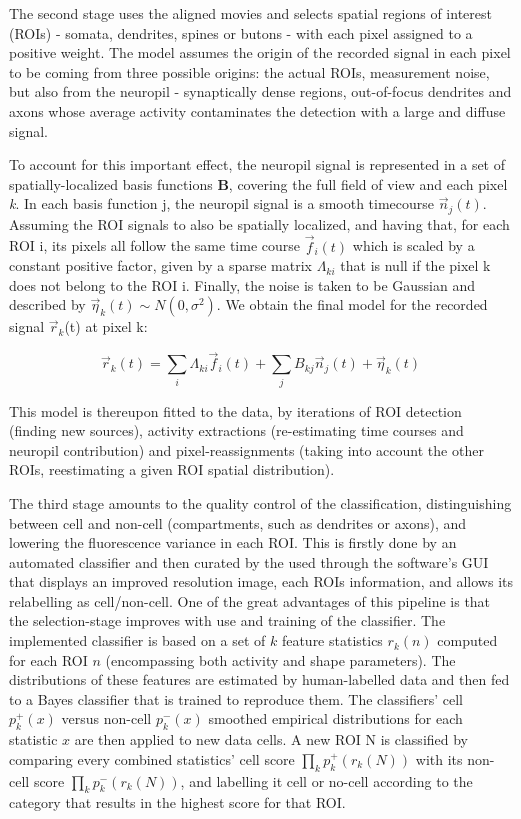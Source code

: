 The second stage uses the aligned movies and selects spatial regions of interest (ROIs) - somata, dendrites, spines or butons - with each pixel assigned to a positive weight. The model assumes the origin of the recorded signal in each pixel to be coming from three possible origins: the actual ROIs, measurement noise, but also from the neuropil - synaptically dense regions, out-of-focus dendrites and axons whose average activity contaminates the detection with a large and diffuse signal. 

To account for this important effect, the neuropil signal is represented in a set of spatially-localized basis functions \textbf{B}, covering the full field of view and each pixel \textit{k}. In each basis function j, the neuropil signal is a smooth timecourse $\vec{n}_{j}(t)$. Assuming the ROI signals to also be spatially localized, and having that, for each ROI i, its pixels all follow the same time course $\vec{f}_i(t)$ which is scaled by a constant positive factor, given by a sparse matrix $\Lambda _{ki}$ that is null if the pixel k does not belong to the ROI i. Finally, the noise is taken to be Gaussian and described by $\vec{\eta} _k(t) \sim N(0, \sigma ^2)$. We obtain the final model for the recorded signal $\vec{r}_k$(t) at pixel k:

\begin{equation}
    \vec{r}_k(t)=\sum_i \Lambda _{ki} \vec{f}_i (t) + \sum _j B_{kj} \vec{n}_j(t) + \vec{\eta}_k(t)
\end{equation}

This model is thereupon fitted to the data, by iterations of ROI detection (finding new sources), activity extractions (re-estimating time courses and neuropil contribution) and pixel-reassignments (taking into account the other ROIs, reestimating a given ROI spatial distribution).

The third stage amounts to the quality control of the classification, distinguishing between cell and non-cell (compartments, such as dendrites or axons), and lowering the fluorescence variance in each ROI. This is firstly done by an automated classifier and then curated by the used through the software's GUI that displays an improved resolution image, each ROIs information,  and allows its relabelling as cell/non-cell. One of the great advantages of this pipeline is that the selection-stage improves with use and training of the classifier. The implemented classifier is based on a set of $k$ feature statistics $r_k(n)$ computed for each ROI $n$ (encompassing both activity and shape parameters). The distributions of these features are estimated by human-labelled data and then fed to a Bayes classifier that is trained to reproduce them. The classifiers' cell $p^+_k(x)$ versus non-cell $p^-_k(x)$ smoothed empirical distributions for each statistic $x$ are then applied to new data cells. A new ROI N is classified by comparing every combined statistics' cell score $\prod_k p^+_k(r_k(N))$ with its non-cell score $\prod_k p^-_k(r_k(N))$, and labelling it cell or no-cell according to the category that results in the highest score for that ROI.


